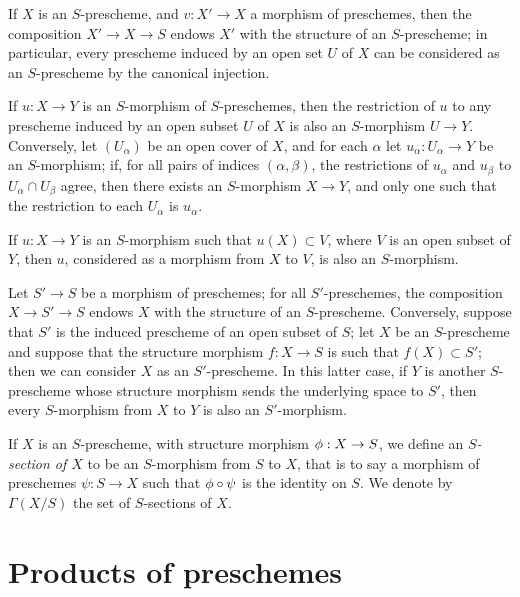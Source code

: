 \begin{env}[2.5.3]
\label{env-1.2.5.3}
If $X$ is an $S$-prescheme, and $v:X'\to X$ a morphism of preschemes,
then the composition $X'\to X\to S$ endows $X'$ with the structure of an $S$-prescheme;
in particular, every prescheme induced by an open set $U$ of $X$ can be considered as an
$S$-prescheme by the canonical injection.

If $u:X\to Y$ is an $S$-morphism of $S$-preschemes, then the restriction
of $u$ to any prescheme induced by an open subset $U$ of $X$ is also an
$S$-morphism $U\to Y$. Conversely, let $(U_\alpha)$ be an open cover of $X$,
and for each $\alpha$ let $u_\alpha:U_\alpha\to Y$ be an $S$-morphism; if,
for all pairs of indices $(\alpha,\beta)$, the restrictions of $u_\alpha$ and
$u_\beta$ to $U_\alpha\cap U_\beta$ agree, then there exists an $S$-morphism
$X\to Y$, and only one such that the restriction to each $U_\alpha$ is
$u_\alpha$.

If $u:X\to Y$ is an $S$-morphism such that $u(X)\subset V$, where $V$ is
an open subset of $Y$, then $u$, considered as a morphism from $X$ to $V$, is
also an $S$-morphism.
\end{env}

\begin{env}[2.5.4]
\label{env-1.2.5.4}
Let $S'\to S$ be a morphism of preschemes; for all
$S'$-preschemes, the composition $X\to S'\to S$ endows $X$ with the structure of
an $S$-prescheme. Conversely, suppose that $S'$ is the induced prescheme of an
open subset of $S$; let $X$ be an $S$-prescheme and suppose that the structure
morphism $f:X\to S$ is such that $f(X)\subset S'$; then we can consider
$X$ as an $S'$-prescheme. In this latter case, if $Y$ is another $S$-prescheme
whose structure morphism sends the underlying space to $S'$, then every
$S$-morphism from $X$ to $Y$ is also an $S'$-morphism.
\end{env}

\begin{env}[2.5.5]
\label{env-1.2.5.5}
If $X$ is an $S$-prescheme, with structure morphism
$\phi:X\to S$, we define an {\em $S$-section of $X$} to be an
$S$-morphism from $S$ to $X$, that is to say a morphism of preschemes
$\psi:S\to X$ such that $\phi\circ\psi$ is the identity on $S$. We
denote by $\Gamma(X/S)$ the set of $S$-sections of $X$.
\end{env}

\section{Products of preschemes}
\label{section-products-of-preschemes}

